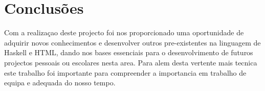 \documentclass{report}
\begin{document}
\chapter{Conclusões}
Com a realizaçao deste projecto foi nos proporcionado uma oportunidade de adquirir novos conhecimentos e desenvolver outros pre-existentes na linguagem de Haskell e HTML, dando nos bases essenciais para o desenvolvimento de futuros projectos pessoais ou escolares nesta area. Para alem desta vertente mais tecnica este trabalho foi importante para compreender a importancia em trabalho de equipa e adequada do nosso tempo. 
\end{document}
